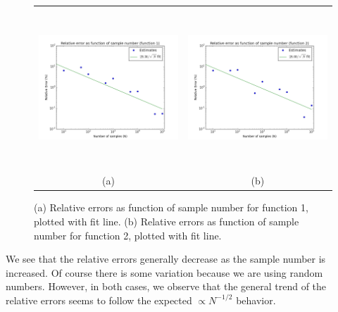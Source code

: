 \documentclass[10pt]{article}
\begin{document}
\begin{figure}[H]
\centering
\begin{tabular}{cc}
\includegraphics[height=170pt]{Figures/function1.png} & 
\includegraphics[height=170pt]{Figures/function2.png} \\
\footnotesize{(a)} & \footnotesize{(b)}
\end{tabular}
\caption{(a) Relative errors as function of sample number for function 1, plotted with fit line. (b) Relative errors as function of sample number for function 2, plotted with fit line.}
\end{figure}              

We see that the relative errors generally decrease as the sample number is increased. Of course there is some variation because we are using random numbers. However, in both cases, we observe that the general trend of the relative errors seems to follow the expected $\propto N^{-1/2}$ behavior.
           
    
\end{document}
